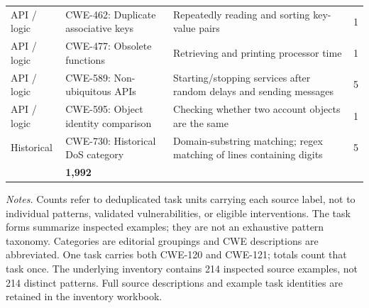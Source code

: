 \begin{longtable}{@{}>{\raggedright\arraybackslash}p{.13\linewidth} >{\raggedright\arraybackslash}p{.25\linewidth} >{\raggedright\arraybackslash}p{} r@{}}
\midrule
API / logic & CWE-462: Duplicate associative keys & Repeatedly reading and sorting key-value pairs & 1 \\
API / logic & CWE-477: Obsolete functions & Retrieving and printing processor time & 1 \\
API / logic & CWE-589: Non-ubiquitous APIs & Starting/stopping services after random delays and sending messages & 5 \\
API / logic & CWE-595: Object identity comparison & Checking whether two account objects are the same & 1 \\
\midrule
Historical & CWE-730: Historical DoS category & Domain-substring matching; regex matching of lines containing digits & 5 \\
\midrule\multicolumn{3}{@{}l}{\textbf{Total (unique task units)}} & \textbf{1,992} \\
\end{longtable}
\noindent\begin{minipage}{\linewidth}\footnotesize \textit{Notes.} Counts refer to deduplicated task units carrying each source label, not to individual patterns, validated vulnerabilities, or eligible interventions. The task forms summarize inspected examples; they are not an exhaustive pattern taxonomy. Categories are editorial groupings and CWE descriptions are abbreviated. One task carries both CWE-120 and CWE-121; totals count that task once. The underlying inventory contains 214 inspected source examples, not 214 distinct patterns. Full source descriptions and example task identities are retained in the inventory workbook.\end{minipage}
\endgroup

